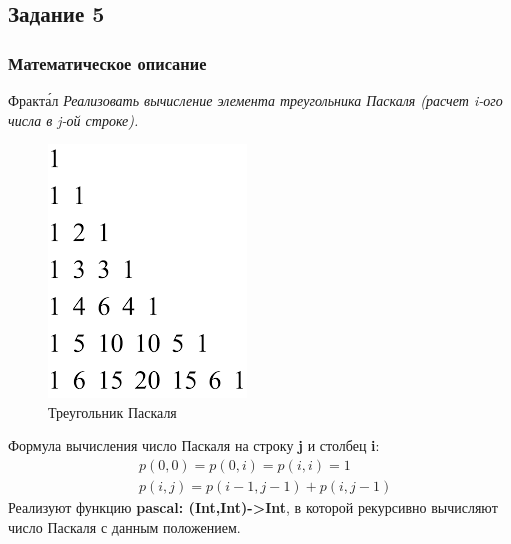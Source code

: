 \documentclass[12pt]{article} %
\begin{document}
\subsection{Задание 5}
\subsubsection{Математическое описание}
Фракта́л 
\textit{
Реализовать вычисление элемента треугольника Паскаля (расчет i-ого числа в j-ой строке).
}
\begin{figure}[H]
\centering\includegraphics{pascal.png}
\caption{Треугольник Паскаля}
\end{figure}
Формула вычисления число Паскаля на строку \textbf{j} и столбец \textbf{i}:
\[ \begin{align}& p(0,0) = p (0,i) = p (i,i) = 1 \\
 & p(i,j) = p(i-1,j-1) + p(i,j -1)\end{align}\]
Реализуют функцию \textbf{pascal: (Int,Int)->Int}, в которой рекурсивно вычисляют число Паскаля с данным положением. 

\newpage
\inputminted[firstline = 48, lastline = 53, frame= single]{Haskell}{F:/git/FuncProg/Assignment1/Assign1.hs}
\end{document}
